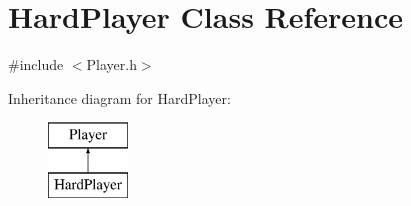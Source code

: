 \hypertarget{class_hard_player}{}\section{Hard\+Player Class Reference}
\label{class_hard_player}


{\ttfamily \#include $<$Player.\+h$>$}

Inheritance diagram for Hard\+Player\+:\begin{figure}[H]
\begin{center}
\leavevmode
\includegraphics[height=2.000000cm]{class_hard_player}
\end{center}
\end{figure}
